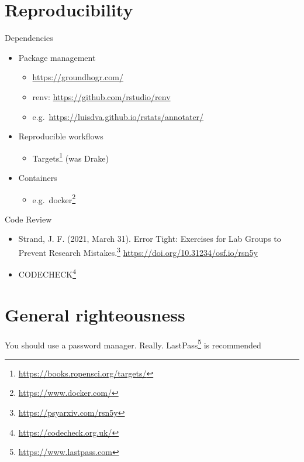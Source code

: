 \documentclass[
  12pt,
  a5paper,
]{book}
\DeclareRobustCommand{\href}[2]{#2\footnote{\url{#1}}}
\providecommand{\tightlist}{%
  \setlength{\itemsep}{0pt}\setlength{\parskip}{0pt}}
\begin{document}
\hypertarget{reproducibility}{%
\section{Reproducibility}\label{reproducibility}}

Dependencies

\begin{itemize}
\tightlist
\item
  Package management

  \begin{itemize}
  \tightlist
  \item
    \url{https://groundhogr.com/}
  \item
    renv: \url{https://github.com/rstudio/renv}
  \item
    e.g.~\url{https://luisdva.github.io/rstats/annotater/}
  \end{itemize}
\item
  Reproducible workflows

  \begin{itemize}
  \tightlist
  \item
    \href{https://books.ropensci.org/targets/}{Targets} (was Drake)
  \end{itemize}
\item
  Containers

  \begin{itemize}
  \tightlist
  \item
    e.g.~\href{https://www.docker.com/}{docker}
  \end{itemize}
\end{itemize}

Code Review

\begin{itemize}
\tightlist
\item
  Strand, J. F. (2021, March 31). \href{https://psyarxiv.com/rsn5y}{Error Tight: Exercises for Lab Groups to Prevent Research Mistakes.} \url{https://doi.org/10.31234/osf.io/rsn5y}
\item
  \href{https://codecheck.org.uk/}{CODECHECK}
\end{itemize}

\hypertarget{general-righteousness}{%
\section{General righteousness}\label{general-righteousness}}

You should use a password manager. Really. \href{https://www.lastpass.com}{LastPass} is recommended
\end{document}
